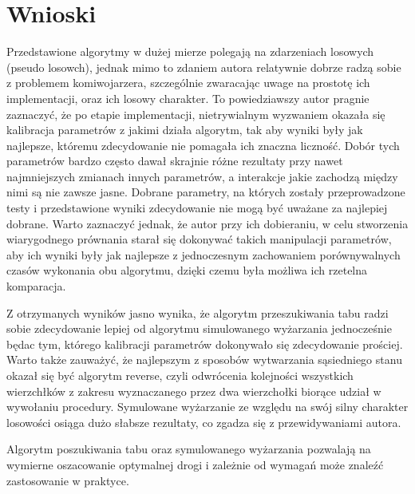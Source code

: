 \documentclass[polish,polish,a4paper]{article}
\begin{document}
\newpage

\newpage

\section{Wnioski}
\hspace{\parindent}
\par Przedstawione algorytmy w dużej mierze polegają na zdarzeniach losowych (pseudo losowch), jednak mimo to zdaniem autora relatywnie dobrze
radzą sobie z problemem komiwojarzera, szczególnie zwaracając uwage na prostotę ich implementacji, oraz ich losowy charakter.
To powiedziawszy autor pragnie zaznaczyć, że po etapie implementacji, nietrywialnym wyzwaniem okazała się kalibracja parametrów z jakimi
działa algorytm, tak aby wyniki były jak najlepsze, któremu zdecydowanie nie pomagała ich znaczna liczność.
Dobór tych parametrów bardzo często dawał skrajnie różne rezultaty przy nawet najmniejszych zmianach innych parametrów, a interakcje jakie zachodzą
między nimi są nie zawsze jasne.
Dobrane parametry, na których zostały przeprowadzone testy i przedstawione wyniki zdecydowanie nie mogą być uważane za najlepiej dobrane. Warto zaznaczyć
jednak, że autor przy ich dobieraniu, w celu stworzenia wiarygodnego prównania starał się dokonywać takich manipulacji parametrów, aby ich wyniki były
jak najlepsze z jednoczesnym zachowaniem porównywalnych czasów wykonania obu algorytmu, dzięki czemu była możliwa ich rzetelna komparacja.

\par Z otrzymanych wyników jasno wynika, że algorytm przeszukiwania tabu radzi sobie zdecydowanie lepiej od algorytmu simulowanego wyżarzania jednocześnie
będac tym, którego kalibracji parametrów dokonywało się zdecydowanie prościej. Warto także zauważyć, że najlepszym z sposobów wytwarzania sąsiedniego stanu
okazał się być algorytm reverse, czyli odwrócenia kolejności wszystkich wierzchłków z zakresu wyznaczanego przez dwa wierzchołki biorące udział w wywołaniu
procedury. Symulowane wyżarzanie ze względu na swój silny charakter losowości osiąga dużo słabsze rezultaty, co zgadza się z przewidywaniami autora.

\par Algorytm poszukiwania tabu oraz symulowanego wyżarzania pozwalają na wymierne oszacowanie optymalnej drogi i zależnie od wymagań może znaleźć
zastosowanie w praktyce.



\end{document}
